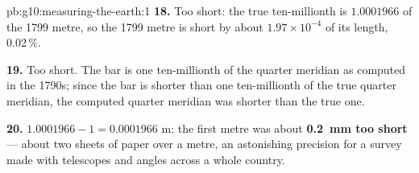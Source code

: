\begin{solution}{pb:g10:measuring-the-earth:1}
\textbf{18.} Too short: the true ten-millionth is $1.0001966$ of the 1799
metre, so the 1799 metre is short by about $1.97 \times 10^{-4}$ of its
length, 0.02\,\%.

\textbf{19.} Too short. The bar is one ten-millionth of the quarter meridian
as computed in the 1790s; since the bar is shorter than one ten-millionth of
the true quarter meridian, the computed quarter meridian was shorter than the
true one.

\textbf{20.} $1.0001966 - 1 = 0.0001966$ m: the first metre was about
\textbf{\qty{0.2}{mm} too short} --- about two sheets of paper over a metre,
an astonishing precision for a survey made with telescopes and angles across
a whole country.
\end{solution}
